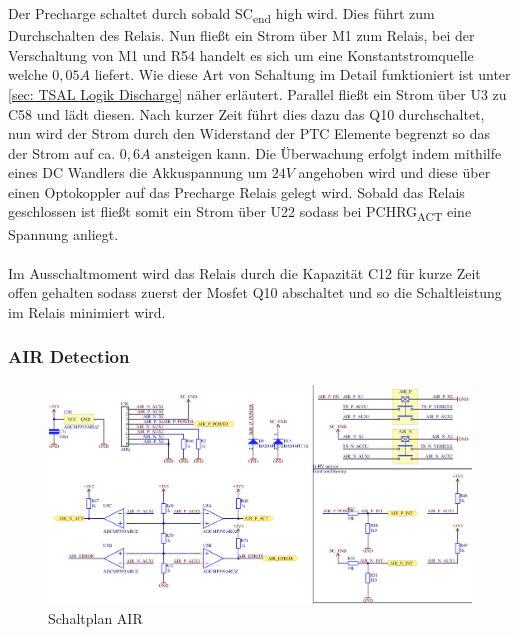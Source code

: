 Der Precharge schaltet durch sobald SC\textsubscript{end} high wird. Dies führt zum Durchschalten des Relais. Nun fließt ein Strom über M1 zum Relais, bei der Verschaltung von M1 und R54 handelt es sich um eine Konstantstromquelle welche \ensuremath{0,05A} liefert. Wie diese Art von Schaltung im Detail funktioniert ist unter \ref{sec: TSAL Logik Discharge} näher erläutert. Parallel fließt ein Strom über U3 zu C58 und lädt diesen. Nach kurzer Zeit führt dies dazu das Q10 durchschaltet, nun wird der Strom durch den Widerstand der PTC Elemente begrenzt so das der Strom auf ca. \ensuremath{0,6 A} ansteigen kann. Die Überwachung erfolgt indem mithilfe eines DC Wandlers die Akkuspannung um \ensuremath{24 V} angehoben wird und diese über einen Optokoppler auf das Precharge Relais gelegt wird. Sobald das Relais geschlossen ist fließt somit ein Strom über U22 sodass bei PCHRG\textsubscript{ACT} eine Spannung anliegt.\\
\\
Im Ausschaltmoment wird das Relais durch die Kapazität C12 für kurze Zeit offen gehalten sodass zuerst der Mosfet Q10 abschaltet und so die Schaltleistung im Relais minimiert wird.
\FloatBarrier

\subsubsection{\ac{AIR} Detection}

\begin{figure}
	\centering
	\includegraphics[width=0.8\linewidth]{bilder/AIR_conditioning}
	\caption{Schaltplan AIR}
	\label{fig:airconditioning}
\end{figure}

